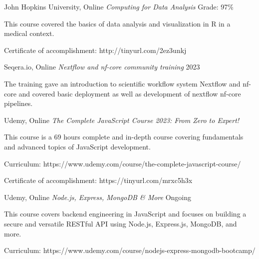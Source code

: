 \begin{cventries}
\cventry
  {John Hopkins University, Online} %
  {\textit{Computing for Data Analysis}} %
  {Grade: 97\%} %
  {} %
  {
    \begin{cvitems} %
      \item {This course covered the basics of data analysis and visualization in R in a medical context.}
      \item {Certificate of accomplishment: http://tinyurl.com/2ez3unkj}
    \end{cvitems}
  }
  \newline

  \cventry
  {Seqera.io, Online} %
  {\textit{Nextflow and nf-core community training}} %
  {2023} %
  {} %
  {
    \begin{cvitems} %
      \item {The training gave an introduction to scientific workflow system Nextflow and nf-core and covered basic deployment as well as development of nextflow nf-core pipelines.}
    \end{cvitems}
  }
  \newline


\cventry
  {Udemy, Online} %
  {\textit{The Complete JavaScript Course 2023: From Zero to Expert!}} %
  {} %
  {} %
  {
    \begin{cvitems} %
      \item {This course is a 69 hours complete and in-depth course covering fundamentals and advanced topics of JavaScript development.}
      \item {Curriculum: https://www.udemy.com/course/the-complete-javascript-course/}
      \item {Certificate of accomplishment: https://tinyurl.com/mrxc5h3x}
    \end{cvitems}
  }
  \newline

\cventry
  {Udemy, Online} %
  {\textit{Node.js, Express, MongoDB \& More}} %
  {Ongoing} %
  {} %
  {
    \begin{cvitems} %
      \item {This course covers backend engineering in JavaScript and focuses on building a secure and versatile RESTful API using Node.js, Express.js, MongoDB, and more.}
      \item {Curriculum: https://www.udemy.com/course/nodejs-express-mongodb-bootcamp/}
    \end{cvitems}
  }
  \newline


\end{cventries}
